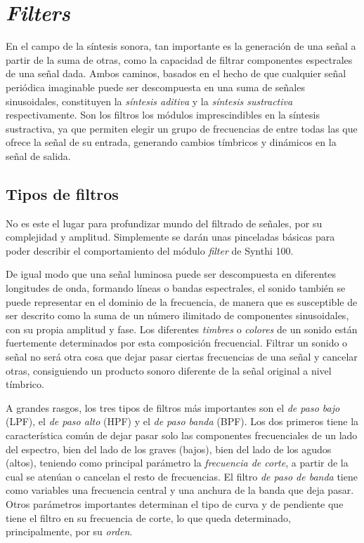 \section{\textit{Filters}}

En el campo de la síntesis sonora, tan importante es la generación de una señal a partir de la suma de otras, como la capacidad de filtrar componentes espectrales de una señal dada. Ambos caminos, basados en el hecho de que cualquier señal periódica imaginable puede ser descompuesta en una suma de señales sinusoidales, constituyen la \textit{síntesis aditiva} y la \textit{síntesis sustractiva} respectivamente. Son los filtros los módulos imprescindibles en la síntesis sustractiva, ya que permiten elegir un grupo de frecuencias de entre todas las que ofrece la señal de su entrada, generando cambios tímbricos y dinámicos en la señal de salida.

\subsection{Tipos de filtros}

No es este el lugar para profundizar mundo del filtrado de señales, por su complejidad y amplitud. Simplemente se darán unas pinceladas básicas para poder describir el comportamiento del módulo \textit{filter} de Synthi 100.

De igual modo que una señal luminosa puede ser descompuesta en diferentes longitudes de onda, formando líneas o bandas espectrales, el sonido también se puede representar en el dominio de la frecuencia, de manera que es susceptible de ser descrito como la suma de un número ilimitado de componentes sinusoidales, con su propia amplitud y fase. Los diferentes \textit{timbres} o \textit{colores} de un sonido están fuertemente determinados por esta composición frecuencial. Filtrar un sonido o señal no será otra cosa que dejar pasar ciertas frecuencias de una señal y cancelar otras, consiguiendo un producto sonoro diferente de la señal original a nivel tímbrico.

A grandes rasgos, los tres tipos de filtros más importantes son el \textit{de paso bajo} (LPF), el \textit{de paso alto} (HPF) y el \textit{de paso banda} (BPF). Los dos primeros tiene la característica común de dejar pasar solo las componentes frecuenciales de un lado del espectro, bien del lado de los graves (bajos), bien del lado de los agudos (altos), teniendo como principal parámetro la \textit{frecuencia de corte}, a partir de la cual se atenúan o cancelan el resto de frecuencias. El filtro \textit{de paso de banda} tiene como variables una frecuencia central y una anchura de la banda que deja pasar. Otros parámetros importantes determinan el tipo de curva y de pendiente que tiene el filtro en su frecuencia de corte, lo que queda determinado, principalmente, por su \textit{orden}. 


